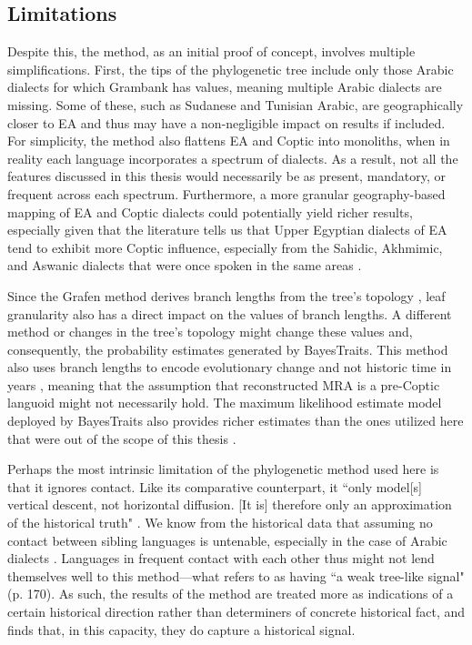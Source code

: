 \documentclass[12pt,a4paper]{article}
\begin{document}
\subsection{Limitations}

Despite this, the method, as an initial proof of concept, involves multiple simplifications. First, the tips of the phylogenetic tree include only those Arabic dialects for which Grambank has values, meaning multiple Arabic dialects are missing. Some of these, such as Sudanese and Tunisian Arabic, are geographically closer to EA and thus may have a non-negligible impact on results if included. For simplicity, the method also flattens EA and Coptic into monoliths, when in reality each language incorporates a spectrum of dialects. As a result, not all the features discussed in this thesis would necessarily be as present, mandatory, or frequent across each spectrum. Furthermore, a more granular geography-based mapping of EA and Coptic dialects could potentially yield richer results, especially given that the literature tells us that Upper Egyptian dialects of EA tend to exhibit more Coptic influence, especially from the Sahidic, Akhmimic, and Aswanic dialects that were once spoken in the same areas \parencite{bishai_coptic_1962, bishai_coptic_1964, bishai_nature_1961, bishai_notes_1960, kiss_nominal_2005}.

Since the Grafen method derives branch lengths from the tree's topology \parencite{dediu_making_2018}, leaf granularity also has a direct impact on the values of branch lengths. A different method or changes in the tree's topology might change these values and, consequently, the probability estimates generated by BayesTraits. This method also uses branch lengths to encode evolutionary change and not historic time in years \parencite{dediu_making_2018}, meaning that the assumption that reconstructed MRA is a pre-Coptic languoid might not necessarily hold. The maximum likelihood estimate model deployed by BayesTraits also provides richer estimates than the ones utilized here that were out of the scope of this thesis \parencite{pagel_bayesian_2004, luo_ancestral_2022}.

Perhaps the most intrinsic limitation of the phylogenetic method used here is that it ignores contact. Like its comparative counterpart, it ``only model[s] vertical descent, not horizontal diffusion. [It is] therefore only an approximation of the historical truth" \parencite[170]{jager_computational_2019}. We know from the historical data that assuming no contact between sibling languages is untenable, especially in the case of Arabic dialects \parencite{neureiter_detecting_2022, lucas_introduction_2020}. Languages in frequent contact with each other thus might not lend themselves well to this method---what \textcite{jager_computational_2019} refers to as having ``a weak tree-like signal" (p. 170). As such, the results of the method are treated more as indications of a certain historical direction rather than determiners of concrete historical fact, and \textcite{jager_computational_2019} finds that, in this capacity, they do capture a historical signal. 
\end{document}
